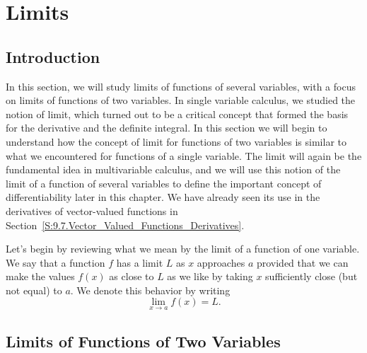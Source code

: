 \section{Limits} \label{S:10.1.Limits}

\vspace*{-14 pt}

\subsection*{Introduction}

In this section, we will study limits of
  functions of several variables, with a focus on limits of functions
  of two variables.   In single variable calculus, we studied the notion of limit, which turned out to be a critical
concept that formed the basis for the derivative and the definite
integral. In this section we will begin to understand how the concept
of limit for functions of two variables is similar to what we
encountered for functions of a single variable.
The limit will again be the fundamental
idea in multivariable calculus, and we will use this notion of the limit
of a function of several variables to define the important concept of
differentiability later in this chapter.  We have already seen its use in the derivatives of vector-valued functions in Section~\ref{S:9.7.Vector_Valued_Functions_Derivatives}.
  
  Let's begin by reviewing what we mean by the
  limit of a function of one variable.  We say that a function $f$ has a limit $L$ as
  $x$ approaches $a$ provided that we can make the values $f(x)$ as close to $L$ as we like
  by taking $x$ sufficiently close (but not equal) to $a$.  We denote this behavior by writing
  $$\lim_{x\to a}f(x) = L.$$



\subsection*{Limits of Functions of Two Variables}

